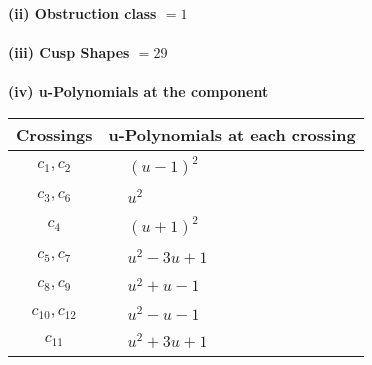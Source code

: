 \documentclass[1p]{elsarticle_modified}
\theoremstyle{definition}
\begin{document}
\flushleft \textbf{(ii) Obstruction class $= 1$}\\~\\
\flushleft \textbf{(iii) Cusp Shapes $= 29$}\\~\\
\newpage\renewcommand{\arraystretch}{1}
\flushleft \textbf{(iv) u-Polynomials at the component}\newline \\
\begin{tabular}{m{50pt}|m{274pt}}
Crossings & \hspace{64pt}u-Polynomials at each crossing \\
\hline $$\begin{aligned}c_{1},c_{2}\end{aligned}$$&$\begin{aligned}
&(u-1)^2
\end{aligned}$\\
\hline $$\begin{aligned}c_{3},c_{6}\end{aligned}$$&$\begin{aligned}
&u^2
\end{aligned}$\\
\hline $$\begin{aligned}c_{4}\end{aligned}$$&$\begin{aligned}
&(u+1)^2
\end{aligned}$\\
\hline $$\begin{aligned}c_{5},c_{7}\end{aligned}$$&$\begin{aligned}
&u^2-3 u+1
\end{aligned}$\\
\hline $$\begin{aligned}c_{8},c_{9}\end{aligned}$$&$\begin{aligned}
&u^2+u-1
\end{aligned}$\\
\hline $$\begin{aligned}c_{10},c_{12}\end{aligned}$$&$\begin{aligned}
&u^2- u-1
\end{aligned}$\\
\hline $$\begin{aligned}c_{11}\end{aligned}$$&$\begin{aligned}
&u^2+3 u+1
\end{aligned}$\\
\hline
\end{tabular}\\~\\
\end{document}
